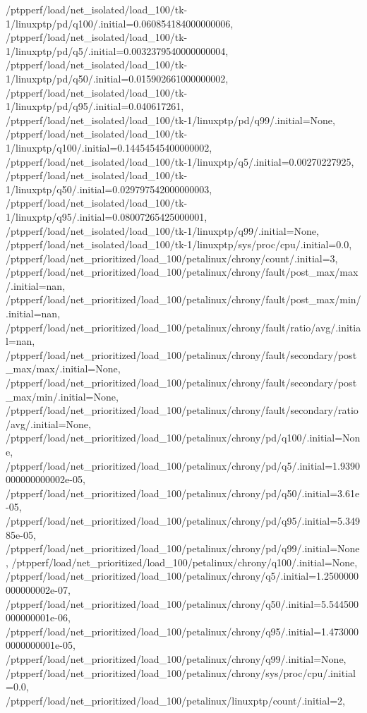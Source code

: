 {    /ptpperf/load/net_isolated/load_100/tk-1/linuxptp/pd/q100/.initial=0.060854184000000006,
    /ptpperf/load/net_isolated/load_100/tk-1/linuxptp/pd/q5/.initial=0.0032379540000000004,
    /ptpperf/load/net_isolated/load_100/tk-1/linuxptp/pd/q50/.initial=0.015902661000000002,
    /ptpperf/load/net_isolated/load_100/tk-1/linuxptp/pd/q95/.initial=0.040617261,
    /ptpperf/load/net_isolated/load_100/tk-1/linuxptp/pd/q99/.initial=None,
    /ptpperf/load/net_isolated/load_100/tk-1/linuxptp/q100/.initial=0.14454545400000002,
    /ptpperf/load/net_isolated/load_100/tk-1/linuxptp/q5/.initial=0.00270227925,
    /ptpperf/load/net_isolated/load_100/tk-1/linuxptp/q50/.initial=0.029797542000000003,
    /ptpperf/load/net_isolated/load_100/tk-1/linuxptp/q95/.initial=0.08007265425000001,
    /ptpperf/load/net_isolated/load_100/tk-1/linuxptp/q99/.initial=None,
    /ptpperf/load/net_isolated/load_100/tk-1/linuxptp/sys/proc/cpu/.initial=0.0,
    /ptpperf/load/net_prioritized/load_100/petalinux/chrony/count/.initial=3,
    /ptpperf/load/net_prioritized/load_100/petalinux/chrony/fault/post_max/max/.initial=nan,
    /ptpperf/load/net_prioritized/load_100/petalinux/chrony/fault/post_max/min/.initial=nan,
    /ptpperf/load/net_prioritized/load_100/petalinux/chrony/fault/ratio/avg/.initial=nan,
    /ptpperf/load/net_prioritized/load_100/petalinux/chrony/fault/secondary/post_max/max/.initial=None,
    /ptpperf/load/net_prioritized/load_100/petalinux/chrony/fault/secondary/post_max/min/.initial=None,
    /ptpperf/load/net_prioritized/load_100/petalinux/chrony/fault/secondary/ratio/avg/.initial=None,
    /ptpperf/load/net_prioritized/load_100/petalinux/chrony/pd/q100/.initial=None,
    /ptpperf/load/net_prioritized/load_100/petalinux/chrony/pd/q5/.initial=1.9390000000000002e-05,
    /ptpperf/load/net_prioritized/load_100/petalinux/chrony/pd/q50/.initial=3.61e-05,
    /ptpperf/load/net_prioritized/load_100/petalinux/chrony/pd/q95/.initial=5.34985e-05,
    /ptpperf/load/net_prioritized/load_100/petalinux/chrony/pd/q99/.initial=None,
    /ptpperf/load/net_prioritized/load_100/petalinux/chrony/q100/.initial=None,
    /ptpperf/load/net_prioritized/load_100/petalinux/chrony/q5/.initial=1.2500000000000002e-07,
    /ptpperf/load/net_prioritized/load_100/petalinux/chrony/q50/.initial=5.544500000000001e-06,
    /ptpperf/load/net_prioritized/load_100/petalinux/chrony/q95/.initial=1.4730000000000001e-05,
    /ptpperf/load/net_prioritized/load_100/petalinux/chrony/q99/.initial=None,
    /ptpperf/load/net_prioritized/load_100/petalinux/chrony/sys/proc/cpu/.initial=0.0,
    /ptpperf/load/net_prioritized/load_100/petalinux/linuxptp/count/.initial=2,
}
